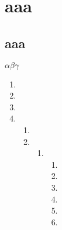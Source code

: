 \documentclass{ctexart}
\begin{document}
\chapter{aaa}
\section{aaa}
\(\alpha \beta \gamma\)
\begin{enumerate}
	\item
	\item
	\item
	\item
	      \begin{enumerate}
		      \item
		      \item
		            \begin{enumerate}
			            \item
			                  \begin{enumerate}
				                  \item
				                  \item
				                  \item
				                  \item
				                  \item
				                  \item
			                  \end{enumerate}

		            \end{enumerate}

	      \end{enumerate}
\end{enumerate}
\end{document}
